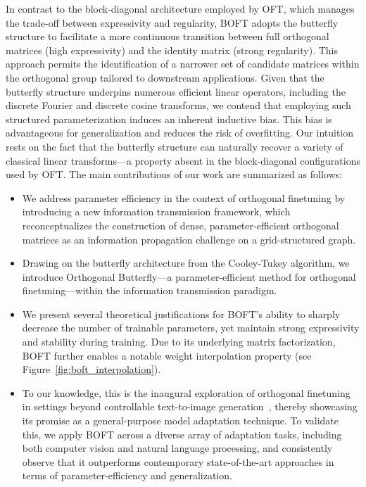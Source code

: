 In contrast to the block-diagonal architecture employed by OFT, which manages the trade-off between expressivity and regularity, BOFT adopts the butterfly structure to facilitate a more continuous transition between full orthogonal matrices (high expressivity) and the identity matrix (strong regularity). This approach permits the identification of a narrower set of candidate matrices within the orthogonal group tailored to downstream applications. Given that the butterfly structure underpins numerous efficient linear operators, including the discrete Fourier and discrete cosine transforms, we contend that employing such structured parameterization induces an inherent inductive bias. This bias is advantageous for generalization and reduces the risk of overfitting. Our intuition rests on the fact that the butterfly structure can naturally recover a variety of classical linear transforms—a property absent in the block-diagonal configurations used by OFT. The main contributions of our work are summarized as follows:

\begin{itemize}[leftmargin=*,nosep]
    \item We address parameter efficiency in the context of orthogonal finetuning by introducing a new information transmission framework, which reconceptualizes the construction of dense, parameter-efficient orthogonal matrices as an information propagation challenge on a grid-structured graph.
    \item Drawing on the butterfly architecture from the Cooley-Tukey algorithm, we introduce Orthogonal Butterfly—a parameter-efficient method for orthogonal finetuning—within the information transmission paradigm.
    \item We present several theoretical justifications for BOFT’s ability to sharply decrease the number of trainable parameters, yet maintain strong expressivity and stability during training. Due to its underlying matrix factorization, BOFT further enables a notable weight interpolation property (see Figure~\ref{fig:boft_interpolation}).
    \item To our knowledge, this is the inaugural exploration of orthogonal finetuning in settings beyond controllable text-to-image generation~\cite{qiu2023controlling}, thereby showcasing its promise as a general-purpose model adaptation technique. To validate this, we apply BOFT across a diverse array of adaptation tasks, including both computer vision and natural language processing, and consistently observe that it outperforms contemporary state-of-the-art approaches in terms of parameter-efficiency and generalization.
\end{itemize}

